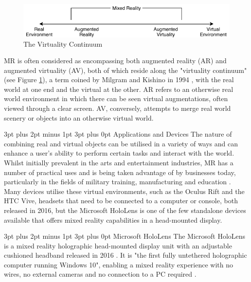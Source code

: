 \documentclass[12pt,a4paper]{article}
\makeatletter
\renewcommand\subsubsection{\@startsection {subsubsection}{1}{0mm} %
	                           {3pt plus 2pt minus 1pt} %
	                           {3pt plus 0pt} %
	                           {\normalfont\bfseries}}
\renewcommand\subsection{\@startsection {subsection}{1}{0mm} %
                               {3pt plus 2pt minus 1pt} %
                               {3pt plus 0pt} %
                               {\large\bfseries}}
\makeatother
\begin{document}
\begin{figure}[!h]
	\centering
	\includegraphics[width=\textwidth]{images/virtualitycontinuum}
	\caption{The Virtuality Continuum}
	\label{fig_mr}
\end{figure}

MR is often considered as encompassing both augmented reality (AR) and augmented virtuality (AV), both of which reside along the "virtuality continuum" (see Figure \ref{fig_mr}), a term coined by Milgram and Kishino in 1994  \cite{milgram94}, with the real world at one end and the virtual at the other. AR refers to an otherwise real world environment in which there can be seen virtual augmentations, often viewed through a clear screen. AV, conversely, attempts to merge real world scenery or objects into an otherwise virtual world.

\subsubsection{Applications and Devices}
The nature of combining real and virtual objects can be utilised in a variety of ways and can enhance a user's ability to perform certain tasks and interact with the world. Whilst initially prevalent in the arts and entertainment industries, MR has a number of practical uses and is being taken advantage of by businesses today, particularly in the fields of military training, manufacturing and education \cite{evans17, hughes97}. Many devices utilise these virtual environments, such as the Oculus Rift and the HTC Vive, headsets that need to be connected to a computer or console, both released in 2016, but the Microsoft HoloLens is one of the few standalone devices available that offers mixed reality capabilities in a head-mounted display.

\subsection{Microsoft HoloLens}
The Microsoft HoloLens is a mixed reality holographic head-mounted display unit with an adjustable cushioned headband released in 2016 \cite{microsoftcorp}. It is "the first fully untethered holographic computer running Windows 10", enabling a mixed reality experience with no wires, no external cameras and no connection to a PC required \cite{holmdahl15}.
\end{document}
